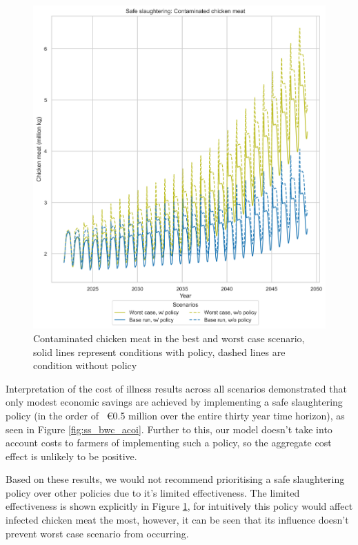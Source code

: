 \begin{figure}[h!]
\begin{minipage}{0.45\textwidth}
        \includegraphics[width=1\textwidth]{images/ss_Base and Worst Case_meat.png} 
        \caption{Contaminated chicken meat in the best and worst case scenario, solid lines represent conditions with policy, dashed lines are condition without policy}
        \label{fig:ss_bwc_meat}
    \end{minipage}
\end{figure}


Interpretation of the cost of illness results across all scenarios demonstrated that only modest economic savings are achieved by implementing a safe slaughtering policy (in the order of ~€0.5 million over the entire thirty year time horizon), as seen in Figure \ref{fig:ss_bwc_acoi}. Further to this, our model doesn't take into account costs to farmers of implementing such a policy, so the aggregate cost effect is unlikely to be positive.

Based on these results, we would not recommend prioritising a safe slaughtering policy over other policies due to it's limited effectiveness. The limited effectiveness is shown explicitly in Figure \ref{fig:ss_bwc_meat}, for intuitively this policy would affect infected chicken meat the most, however, it can be seen that its influence doesn't prevent worst case scenario from occurring. 

